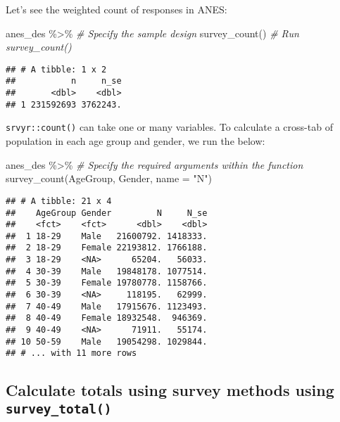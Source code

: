 \documentclass[
]{krantz}
\makeatletter
\newenvironment{Shaded}{\begin{snugshade}}{\end{snugshade}}
\newcommand{\AttributeTok}[1]{\textcolor[rgb]{0.61,0.61,0.61}{#1}}
\newcommand{\CommentTok}[1]{\textcolor[rgb]{0.37,0.37,0.37}{\textit{#1}}}
\newcommand{\FunctionTok}[1]{\textcolor[rgb]{0,0,0}{#1}}
\newcommand{\NormalTok}[1]{#1}
\newcommand{\SpecialCharTok}[1]{\textcolor[rgb]{0,0,0}{#1}}
\newcommand{\StringTok}[1]{\textcolor[rgb]{0.5,0.5,0.5}{#1}}
\newenvironment{kframe}{%
\medskip{}
\setlength{\fboxsep}{.8em}
 \def\at@end@of@kframe{}%
 \ifinner\ifhmode%
  \def\at@end@of@kframe{\end{minipage}}%
  \begin{minipage}{\columnwidth}%
 \fi\fi%
 \def\FrameCommand##1{\hskip\@totalleftmargin \hskip-\fboxsep
 \colorbox{shadecolor}{##1}\hskip-\fboxsep
     \hskip-\linewidth \hskip-\@totalleftmargin \hskip\columnwidth}%
 \MakeFramed {\advance\hsize-\width
   \@totalleftmargin\z@ \linewidth\hsize
   \@setminipage}}%
 {\par\unskip\endMakeFramed%
 \at@end@of@kframe}
\renewenvironment{Shaded}{\begin{kframe}}{\end{kframe}}
\makeatother
\begin{document}
Let's see the weighted count of responses in ANES:

\begin{Shaded}
\begin{Highlighting}[]
\NormalTok{anes\_des }\SpecialCharTok{\%\textgreater{}\%} \CommentTok{\#  Specify the sample design}
  \FunctionTok{survey\_count}\NormalTok{() }\CommentTok{\# Run \textasciigrave{}survey\_count()\textasciigrave{}}
\end{Highlighting}
\end{Shaded}

\begin{verbatim}
## # A tibble: 1 x 2
##           n     n_se
##       <dbl>    <dbl>
## 1 231592693 3762243.
\end{verbatim}

\texttt{srvyr::count()} can take one or many variables. To calculate a cross-tab of population in each age group and gender, we run the below:

\begin{Shaded}
\begin{Highlighting}[]
\NormalTok{anes\_des }\SpecialCharTok{\%\textgreater{}\%}
  \CommentTok{\# Specify the required arguments within the function}
  \FunctionTok{survey\_count}\NormalTok{(AgeGroup, Gender, }\AttributeTok{name =} \StringTok{"N"}\NormalTok{) }
\end{Highlighting}
\end{Shaded}

\begin{verbatim}
## # A tibble: 21 x 4
##    AgeGroup Gender         N     N_se
##    <fct>    <fct>      <dbl>    <dbl>
##  1 18-29    Male   21600792. 1418333.
##  2 18-29    Female 22193812. 1766188.
##  3 18-29    <NA>      65204.   56033.
##  4 30-39    Male   19848178. 1077514.
##  5 30-39    Female 19780778. 1158766.
##  6 30-39    <NA>     118195.   62999.
##  7 40-49    Male   17915676. 1123493.
##  8 40-49    Female 18932548.  946369.
##  9 40-49    <NA>      71911.   55174.
## 10 50-59    Male   19054298. 1029844.
## # ... with 11 more rows
\end{verbatim}

\hypertarget{calculate-totals-using-survey-methods-using-survey_total}{%
\subsection{\texorpdfstring{Calculate totals using survey methods using \texttt{survey\_total()}}{Calculate totals using survey methods using survey\_total()}}\label{calculate-totals-using-survey-methods-using-survey_total}}
\end{document}
